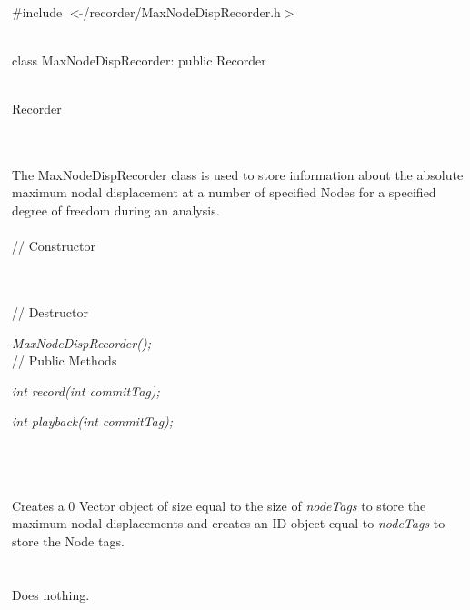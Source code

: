 
   \\
\#include $<\tilde{ }$/recorder/MaxNodeDispRecorder.h$>$  


  \\
class MaxNodeDispRecorder: public Recorder


 \\
Recorder 

\indent{} \\

  \\
\indent The MaxNodeDispRecorder class is used to store information
about the absolute maximum nodal displacement at a number of specified
Nodes for a specified degree of freedom during an analysis. \\

 \\
// Constructor 

\\ \\ 
// Destructor 

{\em $\tilde{ }$MaxNodeDispRecorder();}\\ 

// Public Methods  

{\em int record(int commitTag);}

{\em int playback(int commitTag);}

\\ 

  \\
\\ 
Creates a $0$ Vector object of size equal to the size of {\em
nodeTags} to store the maximum nodal displacements
and creates an ID object equal to {\em nodeTags} to store the Node
tags. \\

 \\
\\ 
Does nothing. \\

